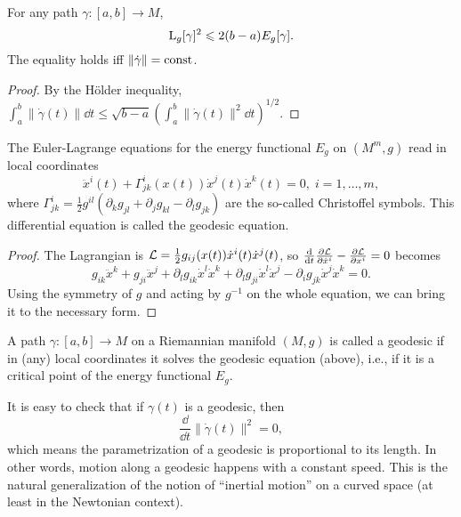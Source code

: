 \begin{lem}\label{length<energy lemma}
For any path $\gamma:[a,b]\to M$, 
\[\mathrm{L}_g[\gamma]^2\leqslant 2(b-a)E_g[\gamma].\] The equality holds iff $\lVert \dot\gamma \rVert =\mathrm{const}$.
\end{lem}
\begin{proof}
    By the H\"older inequality, $\int_a^b \lVert \dot\gamma(t)\rVert \dd t\leq \sqrt{b-a} \left(\int_a^b \lVert \dot\gamma(t)\rVert^2\dd t\right)^{1/2}$.
\end{proof}

\begin{lem}
    The Euler-Lagrange equations for the energy functional $E_g$ on $(M^m,g)$ read in local coordinates 
    \[\ddot x^i(t)+\Gamma^i_{jk}(x(t))\dot x^j(t)\dot x^k(t)=0,\; i=1,\ldots,m,\]
    where $\Gamma^i_{jk}=\frac 12 g^{il}(\partial_k g_{jl}+\partial_jg_{kl}-\partial_l g_{jk})$ are the so-called Christoffel symbols. This differential equation is called the geodesic equation.
\end{lem}
\begin{proof}
    The Lagrangian is $\mathcal{L}=\frac12 g_{ij}(x(t))\dot x^i(t)\dot x^j(t)$, so $\frac{\mathop{}\!\mathrm{d}}{\mathop{}\!\mathrm{d} t}\frac{\partial\mathcal{L}}{\partial \dot x^i}-\frac{\partial \mathcal{L}}{\partial x^i}=0$ becomes 
    \[g_{ik}\ddot x^k+g_{ji}\ddot x^j+\partial_l g_{ik}\dot x^l\dot x^k+\partial_l g_{ji}\dot x^l\dot x^j-\partial_i g_{jk}\dot x^j\dot x^k=0.\]
    Using the symmetry of $g$ and acting by $g^{-1}$ on the whole equation, we can bring it to the necessary form.
\end{proof}

\begin{defn}[Geodesic]
    A path $\gamma:[a,b]\to M$ on a Riemannian manifold $(M,g)$ is called a geodesic if in (any) local coordinates it solves the geodesic equation (above), i.e., if it is a critical point of the energy functional $E_g$.
\end{defn}

It is easy to check that if $\gamma(t)$ is a geodesic, then 
\[\frac{\dd}{\dd t}\lVert \dot\gamma(t)\rVert^2=0,\]
which means the parametrization of a geodesic is proportional to its length. In other words, motion along a geodesic happens with a constant speed. This is the natural generalization of the notion of ``inertial motion'' on a curved space (at least in the Newtonian context).


